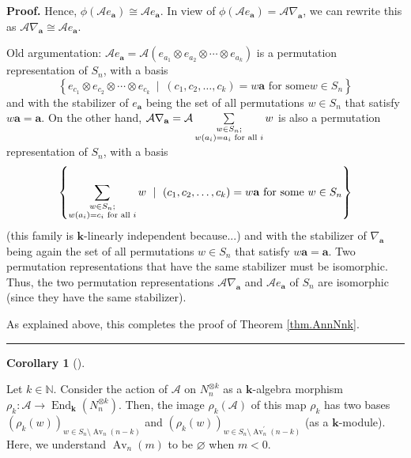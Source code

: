 \documentclass[numbers=enddot,12pt,final,onecolumn,notitlepage]{scrartcl}%
\numberwithin{exer}{subsection}
\theoremstyle{definition}
\newtheorem{coro}[theo]{Corollary}
\newenvironment{corollary}[1][]
{\begin{coro}[#1]\begin{leftbar}}
{\end{leftbar}\end{coro}}
\newenvironment{proof}[1][Proof]{\noindent\textbf{#1.} }{\ \rule{0.5em}{0.5em}}
\let\sumnonlimits\sum
\renewcommand{\sum}{\sumnonlimits\limits}
\newenvironment{noncompile}{}{}
\begin{document}
\begin{proof}
Hence, $\phi\left(  \mathcal{A}e_{\mathbf{a}}\right)  \cong\mathcal{A}%
e_{\mathbf{a}}$. In view of $\phi\left(  \mathcal{A}e_{\mathbf{a}}\right)
=\mathcal{A}\nabla_{\mathbf{a}}$, we can rewrite this as $\mathcal{A}%
\nabla_{\mathbf{a}}\cong\mathcal{A}e_{\mathbf{a}}$.

\begin{noncompile}
Old argumentation: $\mathcal{A}e_{\mathbf{a}}=\mathcal{A}\left(  e_{a_{1}%
}\otimes e_{a_{2}}\otimes\cdots\otimes e_{a_{k}}\right)  $ is a permutation
representation of $S_{n}$, with a basis
\[
\left\{  e_{c_{1}}\otimes e_{c_{2}}\otimes\cdots\otimes e_{c_{k}}%
\ \mid\ \left(  c_{1},c_{2},\ldots,c_{k}\right)  =w\mathbf{a}\text{ for some
}w\in S_{n}\right\}
\]
and with the stabilizer of $e_{\mathbf{a}}$ being the set of all permutations
$w\in S_{n}$ that satisfy $w\mathbf{a}=\mathbf{a}$. On the other hand,
$\mathcal{A}\nabla_{\mathbf{a}}=\mathcal{A}\sum\limits_{\substack{w\in
S_{n};\\w\left(  a_{i}\right)  =a_{i}\text{ for all }i}}w$ is also a
permutation representation of $S_{n}$, with a basis
\[
\left\{  \sum\limits_{\substack{w\in S_{n};\\w\left(  a_{i}\right)
=c_{i}\text{ for all }i}}w\ \mid\ \left(  c_{1},c_{2},\ldots,c_{k}\right)
=w\mathbf{a}\text{ for some }w\in S_{n}\right\}
\]
(this family is $\mathbf{k}$-linearly independent because...) and with the
stabilizer of $\nabla_{\mathbf{a}}$ being again the set of all permutations
$w\in S_{n}$ that satisfy $w\mathbf{a}=\mathbf{a}$. Two permutation
representations that have the same stabilizer must be isomorphic. Thus, the
two permutation representations $\mathcal{A}\nabla_{\mathbf{a}}$ and
$\mathcal{A}e_{\mathbf{a}}$ of $S_{n}$ are isomorphic (since they have the
same stabilizer).
\end{noncompile}

As explained above, this completes the proof of Theorem \ref{thm.AnnNnk}.
\end{proof}

\begin{corollary}
\label{cor.actonNnk}Let $k\in\mathbb{N}$. Consider the action of $\mathcal{A}$
on $N_{n}^{\otimes k}$ as a $\mathbf{k}$-algebra morphism $\rho_{k}%
:\mathcal{A}\rightarrow\operatorname*{End}\nolimits_{\mathbf{k}}\left(
N_{n}^{\otimes k}\right)  $. Then, the image $\rho_{k}\left(  \mathcal{A}%
\right)  $ of this map $\rho_{k}$ has two bases $\left(  \rho_{k}\left(
w\right)  \right)  _{w\in S_{n}\setminus\operatorname*{Av}\nolimits_{n}\left(
n-k\right)  }$ and $\left(  \rho_{k}\left(  w\right)  \right)  _{w\in
S_{n}\setminus\operatorname*{Av}\nolimits_{n}^{\prime}\left(  n-k\right)  }$
(as a $\mathbf{k}$-module). Here, we understand $\operatorname*{Av}%
\nolimits_{n}\left(  m\right)  $ to be $\varnothing$ when $m<0$.
\end{corollary}
\end{document}
